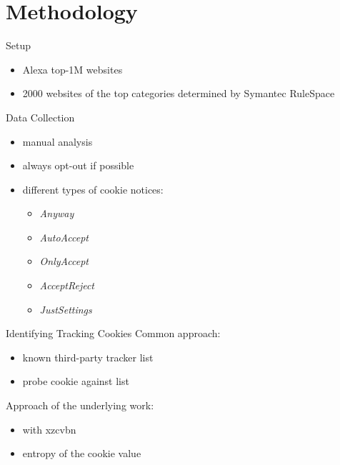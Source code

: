 \documentclass[xcolor={dvipsnames}]{beamer}
\begin{document}
\section{Methodology}

\begin{frame}{Setup}
	\begin{itemize}
		\item Alexa top-1M websites
		\item 2000 websites of the top categories determined by Symantec RuleSpace
	\end{itemize}
\end{frame}

\begin{frame}{Data Collection}
    \begin{itemize}
        \item manual analysis
        \item always opt-out if possible
        \item different types of cookie notices:
            \begin{itemize}
                \item \emph{Anyway}
                \item \emph{AutoAccept}
                \item \emph{OnlyAccept}
                \item \emph{AcceptReject}
                \item \emph{JustSettings}
            \end{itemize}
    \end{itemize}
\end{frame}

\begin{frame}{Identifying Tracking Cookies}
    Common approach:
    \begin{itemize}
        \item known third-party tracker list
        \item probe cookie against list
    \end{itemize}

    \pause
    \vspace{2em}

    Approach of the underlying work:
    \begin{itemize}
        \item with xzcvbn
        \item entropy of the cookie value
    \end{itemize}
\end{frame}
\end{document}
